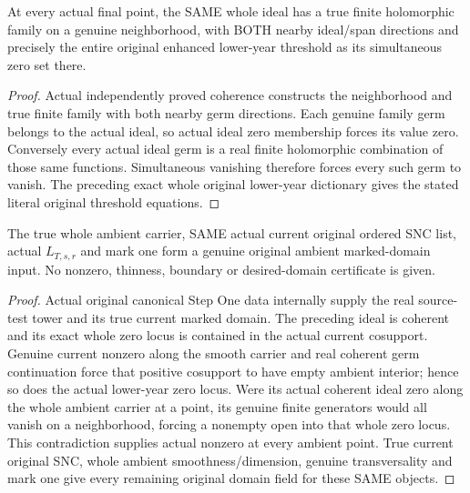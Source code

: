 \begin{theorem}
\label{hir:original-step-one-lower-history-year-local-generators}
\leanok
{}
At every actual final point, the SAME whole ideal has a true finite holomorphic
family on a genuine neighborhood, with BOTH nearby ideal/span directions and
precisely the entire original enhanced lower-year threshold as its simultaneous
zero set there.
\end{theorem}
\begin{proof}
Actual independently proved coherence constructs the neighborhood and true
finite family with both nearby germ directions. Each genuine family germ
belongs to the actual ideal, so actual ideal zero membership forces its value
zero. Conversely every actual ideal germ is a real finite holomorphic
combination of those same functions. Simultaneous vanishing therefore forces
every such germ to vanish. The preceding exact whole original lower-year
dictionary gives the stated literal original threshold equations.
\end{proof}

\begin{theorem}
\label{hir:original-step-one-lower-history-year-actual-marked-domain}
\leanok
{}
The true whole ambient carrier, SAME actual current original ordered SNC list,
actual $L_{T,s,r}$ and mark one form a genuine original ambient marked-domain
input. No nonzero, thinness, boundary or desired-domain certificate is given.
\end{theorem}
\begin{proof}
Actual original canonical Step One data internally supply the real source-test
tower and its true current marked domain. The preceding ideal is coherent and
its exact whole zero locus is contained in the actual current cosupport. Genuine
current nonzero along the smooth carrier and real coherent germ continuation
force that positive cosupport to have empty ambient interior; hence so does
the actual lower-year zero locus. Were its actual coherent ideal zero along the
whole ambient carrier at a point, its genuine finite generators would all
vanish on a neighborhood, forcing a nonempty open into that whole zero locus.
This contradiction supplies actual nonzero at every ambient point. True current
original SNC, whole ambient smoothness/dimension, genuine transversality and
mark one give every remaining original domain field for these SAME objects.
\end{proof}

